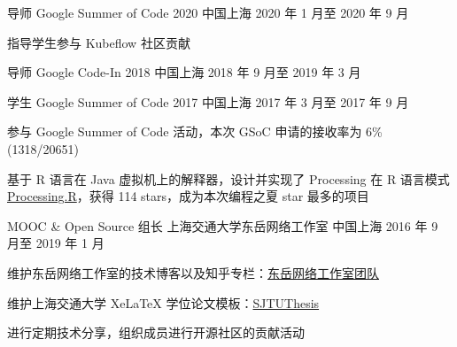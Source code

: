 

\begin{cventries}

  \cventry
    {导师} %
    {Google Summer of Code 2020} %
    {中国上海} %
    {2020 年 1 月至 2020 年 9 月} %
    {
      \begin{cvitems}
        \item 指导学生参与 Kubeflow 社区贡献
      \end{cvitems}
    }

  \cventry
    {导师} %
    {Google Code-In 2018} %
    {中国上海} %
    {2018 年 9 月至 2019 年 3 月} %
    {
    }

  \cventry
    {学生} %
    {Google Summer of Code 2017} %
    {中国上海} %
    {2017 年 3 月至 2017 年 9 月} %
    {
      \begin{cvitems} %
        \item 参与 Google Summer of Code 活动，本次 GSoC 申请的接收率为 6\%(1318/20651)
        \item 基于 R 语言在 Java 虚拟机上的解释器，设计并实现了 Processing 在 R 语言模式 \href{https://github.com/gaocegege/Processing.R}{Processing.R}，获得 114 stars，成为本次编程之夏 star 最多的项目
      \end{cvitems}
    }

  \cventry
    {MOOC \& Open Source 组长} %
    {上海交通大学东岳网络工作室} %
    {中国上海} %
    {2016 年 9 月至 2019 年 1 月} %
    {
      \begin{cvitems}
        \item 维护东岳网络工作室的技术博客以及知乎专栏：\href{https://zhuanlan.zhihu.com/dongyue}{东岳网络工作室团队}
        \item 维护上海交通大学 XeLaTeX 学位论文模板：\href{htts://github.com/sjtug/sjtuthesis}{SJTUThesis}
        \item 进行定期技术分享，组织成员进行开源社区的贡献活动
      \end{cvitems}
    }


\end{cventries}
